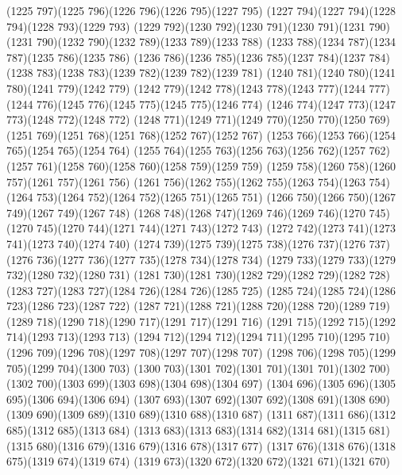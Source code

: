 \cpath (1225 797)(1225 796)(1226 796)(1226 795)(1227 795)
\cpath (1227 794)(1227 794)(1228 794)(1228 793)(1229 793)
\cpath (1229 792)(1230 792)(1230 791)(1230 791)(1231 790)
\cpath (1231 790)(1232 790)(1232 789)(1233 789)(1233 788)
\cpath (1233 788)(1234 787)(1234 787)(1235 786)(1235 786)
\cpath (1236 786)(1236 785)(1236 785)(1237 784)(1237 784)
\cpath (1238 783)(1238 783)(1239 782)(1239 782)(1239 781)
\cpath (1240 781)(1240 780)(1241 780)(1241 779)(1242 779)
\cpath (1242 779)(1242 778)(1243 778)(1243 777)(1244 777)
\cpath (1244 776)(1245 776)(1245 775)(1245 775)(1246 774)
\cpath (1246 774)(1247 773)(1247 773)(1248 772)(1248 772)
\cpath (1248 771)(1249 771)(1249 770)(1250 770)(1250 769)
\cpath (1251 769)(1251 768)(1251 768)(1252 767)(1252 767)
\cpath (1253 766)(1253 766)(1254 765)(1254 765)(1254 764)
\cpath (1255 764)(1255 763)(1256 763)(1256 762)(1257 762)
\cpath (1257 761)(1258 760)(1258 760)(1258 759)(1259 759)
\cpath (1259 758)(1260 758)(1260 757)(1261 757)(1261 756)
\cpath (1261 756)(1262 755)(1262 755)(1263 754)(1263 754)
\cpath (1264 753)(1264 752)(1264 752)(1265 751)(1265 751)
\cpath (1266 750)(1266 750)(1267 749)(1267 749)(1267 748)
\cpath (1268 748)(1268 747)(1269 746)(1269 746)(1270 745)
\cpath (1270 745)(1270 744)(1271 744)(1271 743)(1272 743)
\cpath (1272 742)(1273 741)(1273 741)(1273 740)(1274 740)
\cpath (1274 739)(1275 739)(1275 738)(1276 737)(1276 737)
\cpath (1276 736)(1277 736)(1277 735)(1278 734)(1278 734)
\cpath (1279 733)(1279 733)(1279 732)(1280 732)(1280 731)
\cpath (1281 730)(1281 730)(1282 729)(1282 729)(1282 728)
\cpath (1283 727)(1283 727)(1284 726)(1284 726)(1285 725)
\cpath (1285 724)(1285 724)(1286 723)(1286 723)(1287 722)
\cpath (1287 721)(1288 721)(1288 720)(1288 720)(1289 719)
\cpath (1289 718)(1290 718)(1290 717)(1291 717)(1291 716)
\cpath (1291 715)(1292 715)(1292 714)(1293 713)(1293 713)
\cpath (1294 712)(1294 712)(1294 711)(1295 710)(1295 710)
\cpath (1296 709)(1296 708)(1297 708)(1297 707)(1298 707)
\cpath (1298 706)(1298 705)(1299 705)(1299 704)(1300 703)
\cpath (1300 703)(1301 702)(1301 701)(1301 701)(1302 700)
\cpath (1302 700)(1303 699)(1303 698)(1304 698)(1304 697)
\cpath (1304 696)(1305 696)(1305 695)(1306 694)(1306 694)
\cpath (1307 693)(1307 692)(1307 692)(1308 691)(1308 690)
\cpath (1309 690)(1309 689)(1310 689)(1310 688)(1310 687)
\cpath (1311 687)(1311 686)(1312 685)(1312 685)(1313 684)
\cpath (1313 683)(1313 683)(1314 682)(1314 681)(1315 681)
\cpath (1315 680)(1316 679)(1316 679)(1316 678)(1317 677)
\cpath (1317 676)(1318 676)(1318 675)(1319 674)(1319 674)
\cpath (1319 673)(1320 672)(1320 672)(1321 671)(1321 670)
